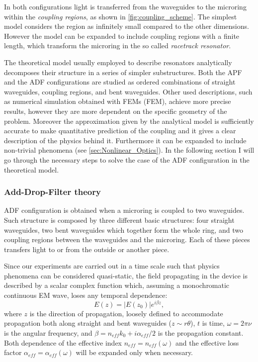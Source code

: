 In both configurations light is transferred from the waveguides to the microring within the \textit{coupling regions}, as shown in \autoref{fig:coupling_scheme}.
The simplest model considers the region as infinitely small compared to the other dimensions.
However the model can be expanded to include coupling regions with a finite length, which transform the microring in the so called \textit{racetrack resonator}.

The theoretical model usually employed to describe resonators analytically decomposes their structure in a series of simpler substructures.
Both the \acs{APF} and the \acs{ADF} configurations are studied as ordered combinations of straight waveguides, coupling regions, and bent waveguides.
Other used descriptions, such as numerical simulation obtained with \aclp{FEM} (\acs{FEM}), achieve more precise results, however they are more dependent on the specific geometry of the problem.
Moreover the approximation given by the analytical model is sufficiently accurate to make quantitative prediction of the coupling and it gives a clear description of the physics behind it.
Furthermore it can be expanded to include non-trivial phenomena (see \autoref{sec:Nonlinear_Optics}).
In the following section I will go through the necessary steps to solve the case of the \acs{ADF} configuration in the theoretical model.

\subsubsection{Add-Drop-Filter theory}
\label{sssec:Add-Drop-Filter_theory}
\acs{ADF} configuration is obtained when a microring is coupled to two waveguides.
Such structure is composed by three different basic structures: four straight waveguides, two bent waveguides which together form the whole ring, and two coupling regions between the waveguides and the microring.
Each of these pieces transfers light to or from the outside or another piece.

Since our experiments are carried out in a time scale such that physics phenomena can be considered quasi-static, the field propagating in the device is described by a scalar complex function which, assuming a monochromatic continuous \acs{EM} wave, loses any temporal dependence:
\begin{equation}
	E(z) = |E(z_0)|e^{i\beta z},
\end{equation}
where $z$ is the direction of propagation, loosely defined to accommodate propagation both along straight and bent waveguides ($z\sim r\theta$), $t$ is time, $\omega=2\pi\nu$ is the angular frequency, and $\beta = n_{eff}k_0+i\alpha_{eff}/2$ is the propagation constant.
Both dependence of the effective index $n_{eff}=n_{eff}\left(\omega\right)$ and the effective loss factor $\alpha_{eff}=\alpha_{eff}\left(\omega\right)$ will be expanded only when necessary.

